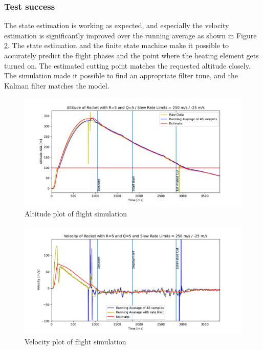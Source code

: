 \subsubsection{Test success}
The state estimation is working as expected, and especially the velocity estimation is significantly improved over the running average as shown in Figure \ref{fig:sim-velocity}. The state estimation and the finite state machine make it possible to accurately predict the flight phases and the point where the heating element gets turned on. The estimated cutting point matches the requested altitude closely. The simulation made it possible to find an appropriate filter tune, and the Kalman filter matches the model. 

\begin{figure}[h!]
	\centering
	\includegraphics[width=\textwidth]{plots/sim-altitude}
	\caption{Altitude plot of flight simulation}
	\label{fig:sim-altitude}
\end{figure}

\begin{figure}[h!]
	\centering
	\includegraphics[width=\textwidth]{plots/sim-velocity}
	\caption{Velocity plot of flight simulation}
	\label{fig:sim-velocity}
\end{figure}


